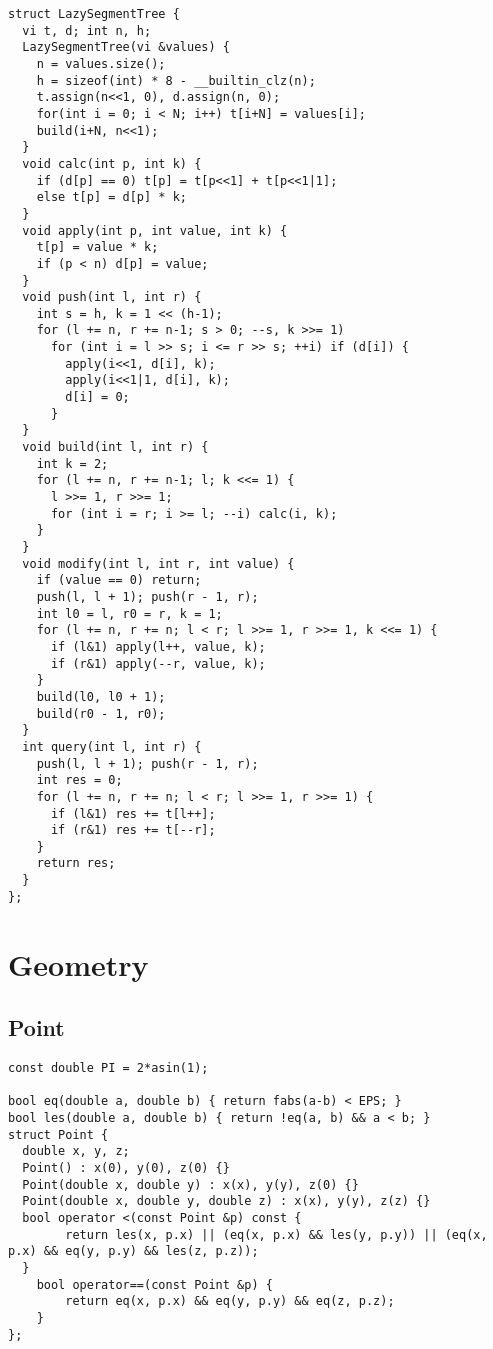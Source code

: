 \documentclass[8pt, oneside]{extarticle}
\begin{document}
\begin{multicols}{3}
\begin{lstlisting}
struct LazySegmentTree {
  vi t, d; int n, h;
  LazySegmentTree(vi &values) {
    n = values.size();
    h = sizeof(int) * 8 - __builtin_clz(n);
    t.assign(n<<1, 0), d.assign(n, 0);
    for(int i = 0; i < N; i++) t[i+N] = values[i];
    build(i+N, n<<1);
  }
  void calc(int p, int k) {
    if (d[p] == 0) t[p] = t[p<<1] + t[p<<1|1];
    else t[p] = d[p] * k;
  }
  void apply(int p, int value, int k) {
    t[p] = value * k;
    if (p < n) d[p] = value;
  }
  void push(int l, int r) {
    int s = h, k = 1 << (h-1);
    for (l += n, r += n-1; s > 0; --s, k >>= 1)
      for (int i = l >> s; i <= r >> s; ++i) if (d[i]) {
        apply(i<<1, d[i], k);
        apply(i<<1|1, d[i], k);
        d[i] = 0;
      }
  }
  void build(int l, int r) {
    int k = 2;
    for (l += n, r += n-1; l; k <<= 1) {
      l >>= 1, r >>= 1;
      for (int i = r; i >= l; --i) calc(i, k);
    }
  }
  void modify(int l, int r, int value) {
    if (value == 0) return;
    push(l, l + 1); push(r - 1, r);
    int l0 = l, r0 = r, k = 1;
    for (l += n, r += n; l < r; l >>= 1, r >>= 1, k <<= 1) {
      if (l&1) apply(l++, value, k);
      if (r&1) apply(--r, value, k);
    }
    build(l0, l0 + 1);
    build(r0 - 1, r0);
  }
  int query(int l, int r) {
    push(l, l + 1); push(r - 1, r);
    int res = 0;
    for (l += n, r += n; l < r; l >>= 1, r >>= 1) {
      if (l&1) res += t[l++];
      if (r&1) res += t[--r];
    }
    return res;
  }
};
\end{lstlisting}

\section{Geometry}

\subsection{Point}
\begin{lstlisting}
const double PI = 2*asin(1);

bool eq(double a, double b) { return fabs(a-b) < EPS; }
bool les(double a, double b) { return !eq(a, b) && a < b; }
struct Point {
  double x, y, z;
  Point() : x(0), y(0), z(0) {}
  Point(double x, double y) : x(x), y(y), z(0) {}
  Point(double x, double y, double z) : x(x), y(y), z(z) {}
  bool operator <(const Point &p) const {
        return les(x, p.x) || (eq(x, p.x) && les(y, p.y)) || (eq(x, p.x) && eq(y, p.y) && les(z, p.z));
  }
    bool operator==(const Point &p) {
        return eq(x, p.x) && eq(y, p.y) && eq(z, p.z);
    }
};


\end{lstlisting}
\end{multicols}
\end{document}
